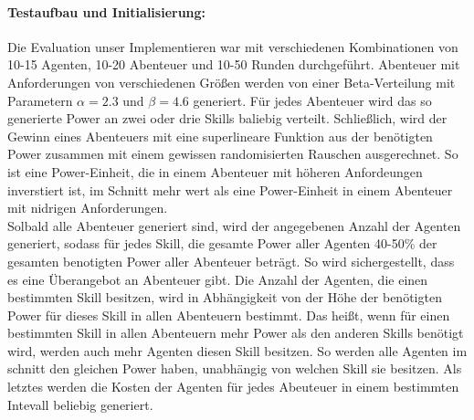 \documentclass[fleqn,10pt]{SelfArx} %
\begin{document}
\paragraph{Testaufbau und Initialisierung:}
Die Evaluation unser Implementieren war mit verschiedenen Kombinationen von 10-15 Agenten, 10-20 Abenteuer und 10-50 Runden durchgeführt. Abenteuer mit Anforderungen von verschiedenen Größen werden von einer Beta-Verteilung mit Parametern $\alpha=2.3$ und $\beta=4.6$ generiert. Für jedes Abenteuer wird das so generierte Power an zwei oder drie Skills baliebig verteilt. Schließlich, wird der Gewinn eines Abenteuers mit eine superlineare Funktion aus der benötigten Power zusammen mit einem gewissen randomisierten Rauschen ausgerechnet. So ist eine Power-Einheit, die in einem Abenteuer mit höheren Anfordeungen inverstiert ist, im Schnitt mehr wert als eine Power-Einheit in einem Abenteuer mit nidrigen Anforderungen.\\
Solbald alle Abenteuer generiert sind, wird der angegebenen Anzahl der Agenten generiert, sodass für jedes Skill, die gesamte Power aller Agenten 40-50\% der gesamten benotigten Power aller Abenteuer beträgt. So wird sichergestellt, dass es eine Überangebot an Abenteuer gibt. Die Anzahl der Agenten, die einen bestimmten Skill besitzen, wird in Abhängigkeit von der Höhe der benötigten Power für dieses Skill in allen Abenteuern bestimmt. Das heißt, wenn für einen bestimmten Skill in allen Abenteuern mehr Power als den anderen Skills benötigt wird, werden auch mehr Agenten diesen Skill besitzen. So werden alle Agenten im schnitt den gleichen Power haben, unabhängig von welchen Skill sie besitzen. Als letztes werden die Kosten der Agenten für jedes Abeuteuer in einem bestimmten Intevall beliebig generiert.
\end{document}
